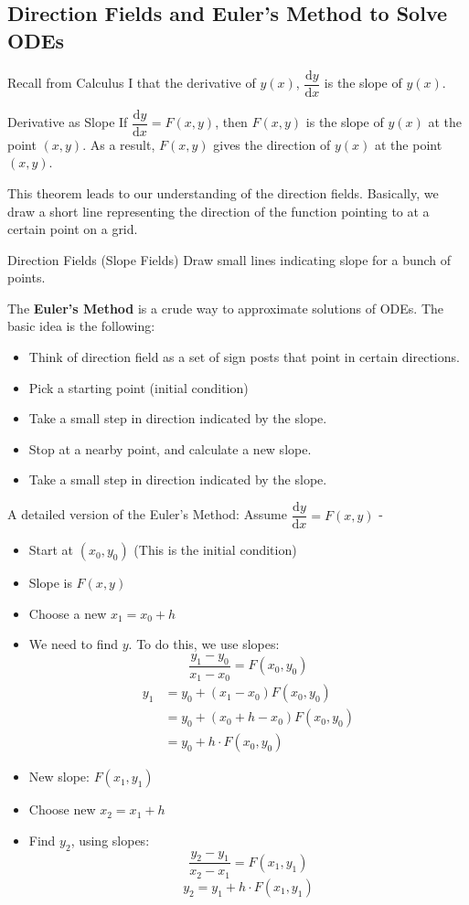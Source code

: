 \documentclass[12pt,a4paper]{article}
\def\d{{\mathrm{d}}}
\begin{document}
\subsection{Direction Fields and Euler's Method to Solve ODEs}
Recall from Calculus I that the derivative of $y(x)$, $\dfrac{\d y}{\d x}$ is the slope of $y(x)$. 
\begin{thm}{Derivative as Slope}
	If $\dfrac{\d y}{\d x}=F(x, y)$, then $F(x,y)$ is the slope of $y(x)$ at the point $(x,y)$. As a result, $F(x,y)$ gives the direction of $y(x)$ at the point $(x,y)$.
\end{thm}
This theorem leads to our understanding of the direction fields. Basically, we draw a short line representing the direction of the function pointing to at a certain point on a grid. 
\begin{df}{Direction Fields (Slope Fields)}
	Draw small lines indicating slope for a bunch of points.
\end{df}
The \textbf{Euler's Method} is a crude way to approximate solutions of ODEs. The basic idea is the following: 
\begin{itemize}
	\item Think of direction field as a set of sign posts that point in certain directions. 
	\item Pick a starting point (initial condition)
	\item Take a small step in direction indicated by the slope. 
	\item Stop at a nearby point, and calculate a new slope. 
	\item Take a small step in direction indicated by the slope. 
\end{itemize} 
A detailed version of the Euler's Method: Assume $\dfrac{\d y}{\d x}=F(x,y)$ - 
\begin{itemize}
	\item Start at $(x_0, y_0)$ (This is the initial condition)
	\item Slope is $F(x,y)$
	\item Choose a new $x_1=x_0+h$
	\item We need to find $y$. To do this, we use slopes: 
	$$\frac{y_1-y_0}{x_1-x_0}=F(x_0,y_0)$$
	$$\begin{aligned}
		y_1&=y_0+(x_1-x_0)F(x_0,y_0)\\
		&=y_0+(x_0+h-x_0)F(x_0,y_0)\\
		&=y_0+h\cdot F(x_0,y_0)
	\end{aligned}$$
	\item New slope: $F(x_1,y_1)$
	\item Choose new $x_2=x_1+h$
	\item Find $y_2$, using slopes: 
	$$\frac{y_2-y_1}{x_2-x_1}=F(x_1,y_1)$$
	$$y_2=y_1+h\cdot F(x_1,y_1)$$
\end{itemize}
\end{document}
